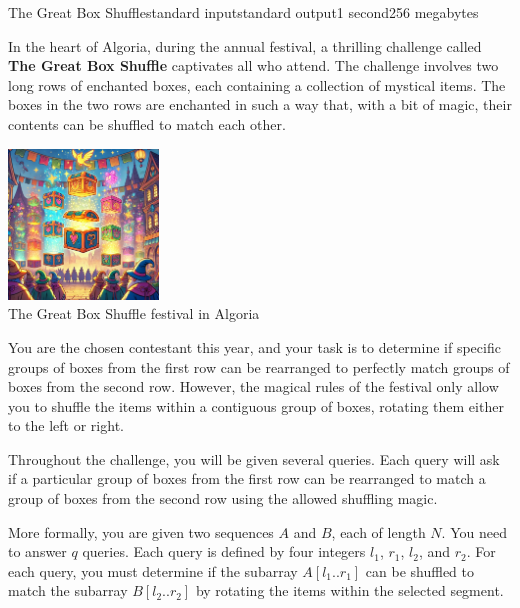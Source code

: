 \begin{problem}{The Great Box Shuffle}{standard input}{standard output}{1 second}{256 megabytes}

In the heart of Algoria, during the annual festival, a thrilling challenge called \textbf{The Great Box Shuffle} captivates all who attend. The challenge involves two long rows of enchanted boxes, each containing a collection of mystical items. The boxes in the two rows are enchanted in such a way that, with a bit of magic, their contents can be shuffled to match each other.

\begin{center}
  \def \htmlPixelsInCm {45}  %
  \includegraphics[width=4cm]{box.png} \\
  \small{The Great Box Shuffle festival in Algoria}
\end{center}

You are the chosen contestant this year, and your task is to determine if specific groups of boxes from the first row can be rearranged to perfectly match groups of boxes from the second row. However, the magical rules of the festival only allow you to shuffle the items within a contiguous group of boxes, rotating them either to the left or right.

Throughout the challenge, you will be given several queries. Each query will ask if a particular group of boxes from the first row can be rearranged to match a group of boxes from the second row using the allowed shuffling magic.

More formally, you are given two sequences \( A \) and \( B \), each of length \( N \). You need to answer \( q \) queries. Each query is defined by four integers \( l_1 \), \( r_1 \), \( l_2 \), and \( r_2 \). For each query, you must determine if the subarray \( A[l_1..r_1] \) can be shuffled to match the subarray \( B[l_2..r_2] \) by rotating the items within the selected segment.


\end{problem}
